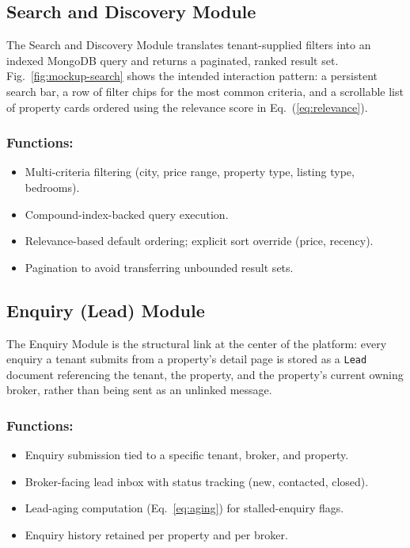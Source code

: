 \documentclass[10pt,twocolumn]{article}
\begin{document}
\subsection{Search and Discovery Module}
The Search and Discovery Module translates tenant-supplied filters into an indexed MongoDB query and returns a paginated, ranked result set. Fig.~\ref{fig:mockup-search} shows the intended interaction pattern: a persistent search bar, a row of filter chips for the most common criteria, and a scrollable list of property cards ordered using the relevance score in Eq.~(\ref{eq:relevance}).
\subsubsection{Functions:}
\begin{itemize}
\item Multi-criteria filtering (city, price range, property type, listing type, bedrooms).
\item Compound-index-backed query execution.
\item Relevance-based default ordering; explicit sort override (price, recency).
\item Pagination to avoid transferring unbounded result sets.
\end{itemize}

\subsection{Enquiry (Lead) Module}
The Enquiry Module is the structural link at the center of the platform: every enquiry a tenant submits from a property's detail page is stored as a \texttt{Lead} document referencing the tenant, the property, and the property's current owning broker, rather than being sent as an unlinked message.
\subsubsection{Functions:}
\begin{itemize}
\item Enquiry submission tied to a specific tenant, broker, and property.
\item Broker-facing lead inbox with status tracking (new, contacted, closed).
\item Lead-aging computation (Eq.~\ref{eq:aging}) for stalled-enquiry flags.
\item Enquiry history retained per property and per broker.
\end{itemize}
\end{document}
